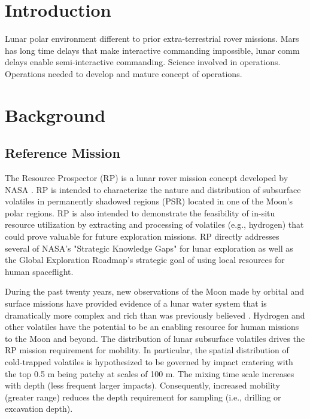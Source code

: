 \documentclass[twocolumn,letterpaper]{IEEEAerospaceCLS}  %
\begin{document}
\section{Introduction}
\label{sec:intro}



Lunar polar environment different to prior extra-terrestrial rover missions. Mars has long time delays that make interactive commanding impossible, lunar comm delays enable semi-interactive commanding. Science involved in operations. Operations needed to develop and mature concept of operations.  

\section{Background}
\label{sec:background}

\subsection{Reference Mission}
The Resource Prospector (RP) is a lunar rover mission concept developed by NASA \cite{andrews2015resource,colaprete2015resource}. 
RP is intended to characterize the nature and distribution of subsurface volatiles in permanently shadowed regions (PSR) located in one of the Moon's polar regions. 
RP is also intended to demonstrate the feasibility of in-situ resource utilization by extracting and processing of volatiles (e.g., hydrogen) that could prove valuable for future exploration missions. 
RP directly addresses several of NASA's "Strategic Knowledge Gaps" for lunar exploration as well as the Global Exploration Roadmap's strategic goal of using local resources for human spaceflight.

During the past twenty years, new observations of the Moon made by orbital and surface missions have provided evidence of a lunar water system that is dramatically more complex and rich than was previously believed \cite{colaprete2017resource}. 
Hydrogen and other volatiles have the potential to be an enabling resource for human missions to the Moon and beyond. 
The distribution of lunar subsurface volatiles drives the RP mission requirement for mobility. 
In particular, the spatial distribution of cold-trapped volatiles is hypothesized to be governed by impact cratering with the top 0.5 m being patchy at scales of 100 m. 
The mixing time scale increases with depth (less frequent larger impacts). 
Consequently, increased mobility (greater range) reduces the depth requirement for sampling (i.e., drilling or excavation depth).
\end{document}
